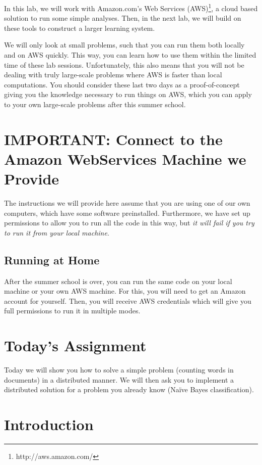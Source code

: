In this lab, we will work with Amazon.com's Web Services (AWS)\footnote{http://aws.amazon.com/}, a cloud based solution
to run some simple analyses. Then, in the next lab, we will build on these
tools to construct a larger learning system.

We will only look at small problems, such that you can run them both locally and on AWS quickly. This way, you can learn how to use them within the limited time of these lab sessions. Unfortunately, this also means that you will not be dealing with truly large-scale problems where AWS is faster than local computations. You should consider these last two days as a proof-of-concept giving you the knowledge necessary to run things on AWS, which you can apply to your own large-scale problems after this summer school.

\section*{IMPORTANT: Connect to the Amazon WebServices Machine we Provide}

The instructions we will provide here assume that you are using one of our own
computers, which have some software preinstalled. Furthermore, we have set up
permissions to allow you to run all the code in this way, but \emph{it will
fail if you try to run it from your local machine}.

\subsection*{Running at Home}

After the summer school is over, you can run the same code on your local
machine or your own AWS machine. For this, you will need to get an Amazon
account for yourself. Then, you will receive AWS credentials which will give
you full permissions to run it in multiple modes.

\section*{Today's Assignment}

Today we will show you how to solve a simple problem (counting words in
documents) in a distributed manner. We will then ask you to implement a
distributed solution for a problem you already know (Na\"{i}ve Bayes
classification).

\section{Introduction}

